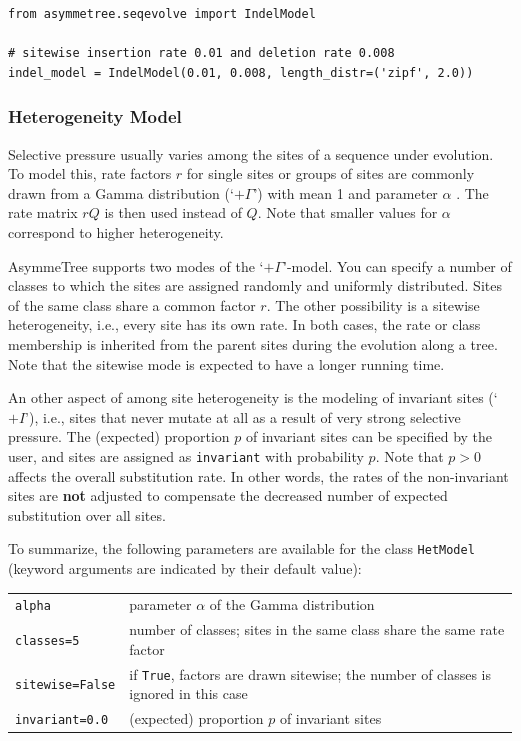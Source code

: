 \documentclass[hidelinks,11pt]{article}
\newcommand{\sq}{\textquotesingle}
\begin{document}
\begin{adjustwidth}{1cm}{1cm}\vspace{2mm}
\begin{verbatim}
from asymmetree.seqevolve import IndelModel

# sitewise insertion rate 0.01 and deletion rate 0.008
indel_model = IndelModel(0.01, 0.008, length_distr=('zipf', 2.0))
\end{verbatim}
\end{adjustwidth}


\subsubsection{Heterogeneity Model}

Selective pressure usually varies among the sites of a sequence under evolution.
To model this, rate factors $r$ for single sites or groups of sites are commonly drawn from a Gamma distribution (`$+\Gamma$') with mean 1 and parameter $\alpha$ \citep{cartwright2005,fletcher2009,dalquen2012}.
The rate matrix $rQ$ is then used instead of $Q$.
Note that smaller values for $\alpha$ correspond to higher heterogeneity.

AsymmeTree supports two modes of the `$+\Gamma$'-model.
You can specify a number of classes to which the sites are assigned randomly and uniformly distributed.
Sites of the same class share a common factor $r$.
The other possibility is a sitewise heterogeneity, i.e., every site has its own rate.
In both cases, the rate or class membership is inherited from the parent sites during the evolution along a tree.
Note that the sitewise mode is expected to have a longer running time.

An other aspect of among site heterogeneity is the modeling of invariant sites (`$+I$'), i.e., sites that never mutate at all as a result of very strong selective pressure.
The (expected) proportion $p$ of invariant sites can be specified by the user,
and sites are assigned as \texttt{\sq invariant\sq} with probability $p$.
Note that $p>0$ affects the overall substitution rate.
In other words, the rates of the non-invariant sites are \textbf{not} adjusted to compensate the decreased number of expected substitution over all sites.

To summarize, the following parameters are available for the class \texttt{HetModel} (keyword arguments are indicated by their default value):

\vspace{3mm}
{\small\centering
\begin{longtable}{ p{4.5cm} p{9cm} }
	\texttt{alpha} & parameter $\alpha$ of the Gamma distribution\\
	\texttt{classes=5} & number of classes; sites in the same class share the same rate factor\\
	\texttt{sitewise=False} & if \texttt{True}, factors are drawn sitewise; the number of classes is ignored in this case\\
	\texttt{invariant=0.0} & (expected) proportion $p$ of invariant sites\\
\end{longtable}
}
\vspace{3mm}
\end{document}
